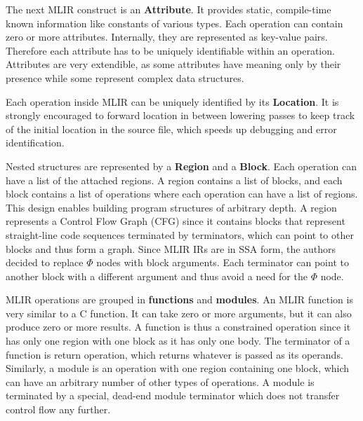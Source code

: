 \documentclass[sigplan,\review anonymous]{acmart}
\begin{document}
The next MLIR construct is an \textbf{Attribute}. It provides static,
compile-time known information like constants of various types. Each operation
can contain zero or more attributes. Internally, they are represented as
key-value pairs. Therefore each attribute has to be uniquely identifiable
within an operation. Attributes are very extendible, as some attributes have
meaning only by their presence while some represent complex data structures.

Each operation inside MLIR can be uniquely identified by its \textbf{Location}.
It is strongly encouraged to forward location in between lowering passes to
keep track of the initial location in the source file, which speeds up
debugging and error identification. 

Nested structures are represented by a \textbf{Region} and a \textbf{Block}.
Each operation can have a list of the attached regions. A region contains a
list of blocks, and each block contains a list of operations where each
operation can have a list of regions. This design enables building program
structures of arbitrary depth. A region represents a Control Flow Graph (CFG)
since it contains blocks that represent straight-line code sequences terminated
by terminators, which can point to other blocks and thus form a graph. Since
MLIR IRs are in SSA form, the authors decided to replace $\Phi$ nodes with
block arguments. Each terminator can point to another block with a different
argument and thus avoid a need for the $\Phi$ node.

MLIR operations are grouped in \textbf{functions} and \textbf{modules}. An
MLIR function is very similar to a C function. It can take zero or more
arguments, but it can also produce zero or more results. A function is thus
a constrained operation since it has only one region with one block as it
has only one body. The terminator of a function is return operation, which
returns whatever is passed as its operands. Similarly, a module is an operation
with one region containing one block, which can have an arbitrary number of
other types of operations. A module is terminated by a special, dead-end module
terminator which does not transfer control flow any further.
\end{document}
